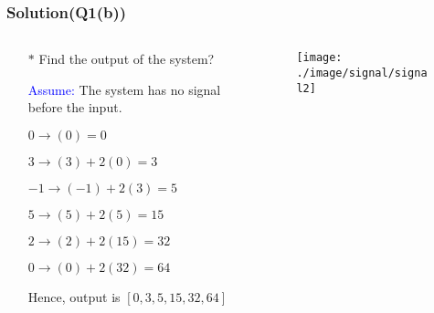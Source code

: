 \documentclass{beamer}
\newcommand{\blue}[1]{\textcolor{blue}{#1}}
\begin{document}
\begin{frame}
\frametitle{Solution(Q1(b))}


\begin{columns}
\begin{column}{6.8 cm}
\begin{itemize} \itemsep1pt \parskip0pt 
  \item[$\ast$] Find the output of the system?
\end{itemize}

\vspace{6 mm}
\begin{itemize} \itemsep1pt \parskip0pt 
  \item[] \blue{Assume:} The system has no signal before the input.
  \item[] \hspace{5 mm}$0 \rightarrow $\hspace{5 mm}$(0) $\hspace{20 mm}$= 0$
  \item[] \hspace{5 mm}$3 \rightarrow $\hspace{5 mm}$(3) + 2(0) $\hspace{8.5 mm}$= 3$
  \item[] \hspace{2 mm}$-1 \rightarrow $\hspace{2 mm}$(-1) + 2(3) $\hspace{8.5 mm}$= 5$
  \item[] \hspace{5 mm}$5 \rightarrow $\hspace{5 mm}$(5) + 2(5) $\hspace{8.3 mm}$= 15$
  \item[] \hspace{5 mm}$2 \rightarrow $\hspace{5 mm}$(2) + 2(15) $\hspace{6.5 mm}$= 32$
  \item[] \hspace{5 mm}$0 \rightarrow $\hspace{5 mm}$(0) + 2(32) $\hspace{6.5 mm}$= 64$
  \item[] Hence, output is $[0,3,5,15,32,64]$
\end{itemize}
\end{column}



\begin{column}{6 cm}
\begin{figure}[H]
  \texttt{[image: ./image/signal/signal2]}
\end{figure}



\end{column}
\end{columns}
\end{frame}
\end{document}
